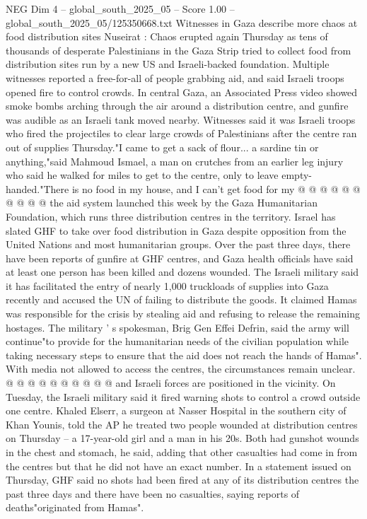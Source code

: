 \begin{textsample}{NEG Dim 4 – global\_south\_2025\_05 – Score 1.00 – global\_south\_2025\_05/125350668.txt}  \label{ex:f4_neg_361}
Witnesses in Gaza describe more chaos at food distribution sites Nuseirat : Chaos erupted again Thursday as tens of thousands of desperate Palestinians in the Gaza Strip tried to collect food from distribution sites run by a new US and Israeli-backed foundation.
Multiple witnesses reported a free-for-all of people grabbing aid, and said Israeli troops opened fire to control crowds.
In central Gaza, an Associated Press video showed smoke bombs arching through the air around a distribution centre, and gunfire was audible as an Israeli tank moved nearby.
Witnesses said it was Israeli troops who fired the projectiles to clear large crowds of Palestinians after the centre ran out of supplies Thursday."I came to get a sack of flour... a sardine tin or anything,"said Mahmoud Ismael, a man on crutches from an earlier leg injury who said he walked for miles to get to the centre, only to leave empty-handed."There is no food in my house, and I can't get food for my @ @ @ @ @ @ @ @ @ @ the aid system launched this week by the Gaza Humanitarian Foundation, which runs three distribution centres in the territory.
Israel has slated GHF to take over food distribution in Gaza despite opposition from the United Nations and most humanitarian groups.
Over the past three days, there have been reports of gunfire at GHF centres, and Gaza health officials have said at least one person has been killed and dozens wounded.
The Israeli military said it has facilitated the entry of nearly 1,000 truckloads of supplies into Gaza recently and accused the UN of failing to distribute the goods.
It claimed Hamas was responsible for the crisis by stealing aid and refusing to release the remaining hostages.
The military ' s spokesman, Brig Gen Effei Defrin, said the army will continue"to provide for the humanitarian needs of the civilian population while taking necessary steps to ensure that the aid does not reach the hands of Hamas".
With media not allowed to access the centres, the circumstances remain unclear. @ @ @ @ @ @ @ @ @ @ and Israeli forces are positioned in the vicinity.
On Tuesday, the Israeli military said it fired warning shots to control a crowd outside one centre.
Khaled Elserr, a surgeon at Nasser Hospital in the southern city of Khan Younis, told the AP he treated two people wounded at distribution centres on Thursday -- a 17-year-old girl and a man in his 20s.
Both had gunshot wounds in the chest and stomach, he said, adding that other casualties had come in from the centres but that he did not have an exact number.
In a statement issued on Thursday, GHF said no shots had been fired at any of its distribution centres the past three days and there have been no casualties, saying reports of deaths"originated from Hamas".

\end{textsample}
